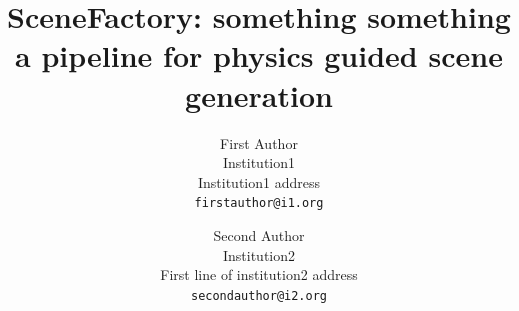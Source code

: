 \documentclass[10pt,twocolumn,letterpaper]{article}
\title{SceneFactory: something something a pipeline for physics guided scene generation}
\author{First Author\\
Institution1\\
Institution1 address\\
{\tt\small firstauthor@i1.org}
\and
Second Author\\
Institution2\\
First line of institution2 address\\
{\tt\small secondauthor@i2.org}
}
\begin{document}
\maketitle
    

 

{
    \small
    
    
}

% 
\end{document}
